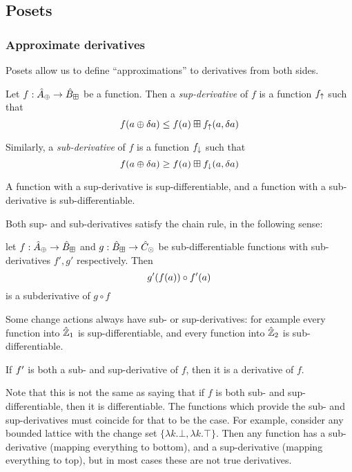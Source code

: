 \subsection{Posets}

\subsubsection{Approximate derivatives}

Posets allow us to define ``approximations'' to derivatives from both sides.

\begin{defn}
  Let $f: \hat{A}_\oplus \rightarrow \hat{B}_\boxplus$ be a function. Then a \textit{sup-derivative}
  of $f$ is a function $f_\uparrow$ such that
  $$f(a \oplus \delta a) \leq f(a) \boxplus f_\uparrow(a, \delta a)$$

  Similarly, a \textit{sub-derivative} of $f$ is a function $f_\downarrow$ such that
  $$f(a \oplus \delta a) \geq f(a) \boxplus f_\downarrow(a, \delta a)$$

  A function with a sup-derivative is sup-differentiable, and a function with a
  sub-derivative is sub-differentiable.
\end{defn}

Both sup- and sub-derivatives satisfy the chain rule, in the following sense:
\begin{prop}
  let $f : \hat{A}_\oplus \rightarrow \hat{B}_\boxplus$ and $g : \hat{B}_\boxplus \rightarrow \hat{C}_\odot$ be
  sub-differentiable functions with sub-derivatives $f', g'$ respectively. Then
  $$g'(f(a)) \circ f'(a)$$ is a subderivative of $g \circ f$
\end{prop}

Some change actions always have sub- or sup-derivatives: for example every function
into $\hat{\mathbb{Z}}_1$ is sup-differentiable, and every function into $\hat{\mathbb{Z}}_2$ is
sub-differentiable.

\begin{prop}
  If $f'$ is both a sub- and sup-derivative of $f$, then it is a derivative of $f$.
\end{prop}

Note that this is not the same as saying that if $f$ is both sub- and
sup-differentiable, then it is differentiable. The functions which provide the
sub- and sup-derivatives must coincide for that to be the case. For example,
consider any bounded lattice with the change set $\{ \lambda k . \bot, \lambda k
 . \top \}$. Then any function has a sub-derivative (mapping everything to
 bottom), and a sup-derivative (mapping everything to top), but in most cases
 these are not true derivatives.

